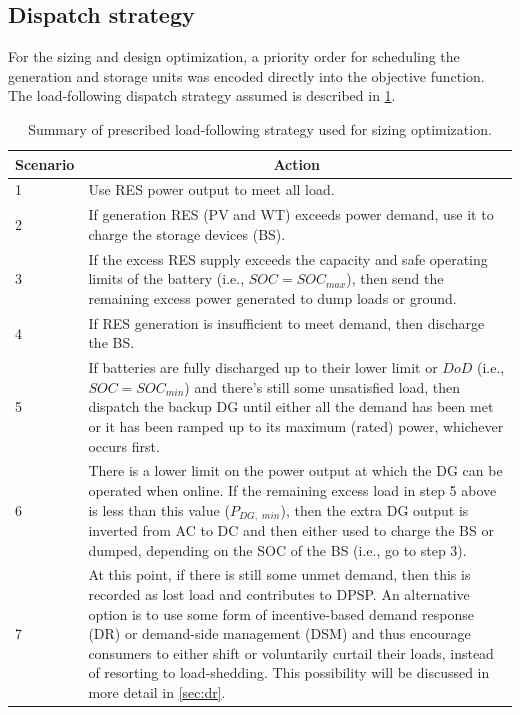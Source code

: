 \documentclass[final,3p,times]{elsarticle}
\begin{document}
\subsection{Dispatch strategy \label{sec:disp_strat}}
For the sizing and design optimization, a priority order for scheduling the generation and storage units was encoded directly into the objective function. The load-following dispatch strategy assumed is described in \cref{tab:dispatch_strat_for_sizing}.
\begin{table}[htbp] 
\centering
\begin{tabular}{p{0.75cm} p{13cm}}
\toprule
\multicolumn{1}{c}{\textbf{Scenario}} & \multicolumn{1}{c}{\textbf{Action}}    \\
\midrule
1 & Use RES power output to meet all load. \\ [1ex]
2 & If generation RES (PV and WT) exceeds power demand, use it to charge the storage devices (BS). \\ [1ex]
3 & If the excess RES supply exceeds the capacity and safe operating limits of the battery (i.e., $SOC = SOC_{max}$), then send the remaining excess power generated to dump loads or ground. \\ [1ex]
4 & If RES generation is insufficient to meet demand, then discharge the BS. \\ [1ex]
5 & If batteries are fully discharged up to their lower limit or $DoD$ (i.e., $SOC = SOC_{min}$) and there’s still some unsatisfied load, then dispatch the backup DG until either all the demand has been met or it has been ramped up to its maximum (rated) power, whichever occurs first. \\ [1ex]
6 & There is a lower limit on the power output at which the DG can be operated when online. If the remaining excess load in step 5 above is less than this value ($P_{DG,\;min}$), then the extra DG output is inverted from AC to DC and then either used to charge the BS or dumped, depending on the SOC of the BS (i.e., go to step 3). \\ [1ex]
7 & At this point, if there is still some unmet demand, then this is recorded as lost load and contributes to DPSP. An alternative option is to use some form of incentive-based demand response (DR) or demand-side management (DSM) and thus encourage consumers to either shift or voluntarily curtail their loads, instead of resorting to load-shedding. This possibility will be discussed in more detail in \cref{sec:dr}. \\ [1ex]
\bottomrule
\end{tabular}
\caption{Summary of prescribed load-following strategy used for sizing optimization.}
\label{tab:dispatch_strat_for_sizing} 
\end{table}
\end{document}
